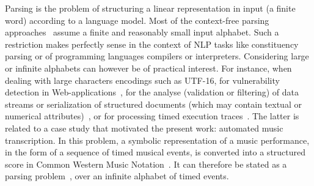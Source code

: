 %
%
Parsing %
is the problem %
of structuring a linear representation in input %
(a finite word) according to a language model. %
%
Most of the context-free parsing approaches~\cite{GruneJacobs08parsing}  
assume a finite and reasonably small input alphabet. %
Such a restriction makes perfectly sense in the context of NLP tasks 
like constituency parsing or of programming languages compilers or interpreters.
Considering large or infinite alphabets can however be of practical interest. %
%
For instance, when dealing with large characters encodings such as UTF-16, %
\eg for vulnerability detection in Web-applications~\cite{dAntoni21CACM}, 
%
for the analyse (\eg validation or filtering) 
of data streams or serialization of structured documents 
(which may contain textual or numerical attributes)~\cite{Segoufin06csl}, 
or for processing timed execution traces~\cite{Bouyer03algebraic}.
The latter is related to a case study that motivated the present work: 
automated music transcription.
In this problem, a symbolic representation of a music performance, %
in the form of a sequence of timed musical events, %
is converted into a structured score in Common Western Music Notation~\cite{Gould11Notation}.
It can therefore be stated as a parsing problem~\cite{foscarin:hal-01988990}, 
over an infinite alphabet of timed events.

